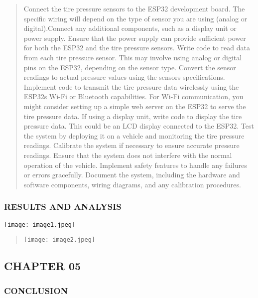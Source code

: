 \documentclass[
]{article}
\begin{document}
\begin{quote}
Connect the tire pressure sensors to the ESP32 development board. The
specific wiring will depend on the type of sensor you are using (analog
or digital).Connect any additional components, such as a display unit or
power supply. Ensure that the power supply can provide sufficient power
for both the ESP32 and the tire pressure sensors. Write code to read
data from each tire pressure sensor. This may involve using analog or
digital pins on the ESP32, depending on the sensor type. Convert the
sensor readings to actual pressure values using the
sensor\textquotesingle s specifications. Implement code to transmit the
tire pressure data wirelessly using the ESP32\textquotesingle s Wi-Fi or
Bluetooth capabilities. For Wi-Fi communication, you might consider
setting up a simple web server on the ESP32 to serve the tire pressure
data. If using a display unit, write code to display the tire pressure
data. This could be an LCD display connected to the ESP32. Test the
system by deploying it on a vehicle and monitoring the tire pressure
readings. Calibrate the system if necessary to ensure accurate pressure
readings. Ensure that the system does not interfere with the normal
operation of the vehicle. Implement safety features to handle any
failures or errors gracefully. Document the system, including the
hardware and software components, wiring diagrams, and any calibration
procedures.
\end{quote}

\hypertarget{results-and-analysis}{%
\subsubsection{RESULTS AND ANALYSIS}\label{results-and-analysis}}

\texttt{[image: image1.jpeg]}

\begin{quote}
\texttt{[image: image2.jpeg]}
\end{quote}
\newpage
\hypertarget{chapter-05}{%
\subsection{CHAPTER 05}\label{chapter-05}}

\hypertarget{conclusion}{%
\subsubsection{CONCLUSION}\label{conclusion}}
\end{document}
